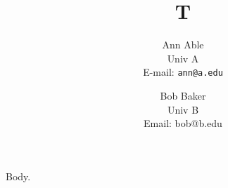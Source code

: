 \documentclass{article}
\begin{document}
\title{T}
\author{Ann Able\\ Univ A\\ E-mail: \texttt{ann@a.edu} \and Bob Baker\\ Univ B\\ Email: bob@b.edu}
\maketitle
Body.
\end{document}
